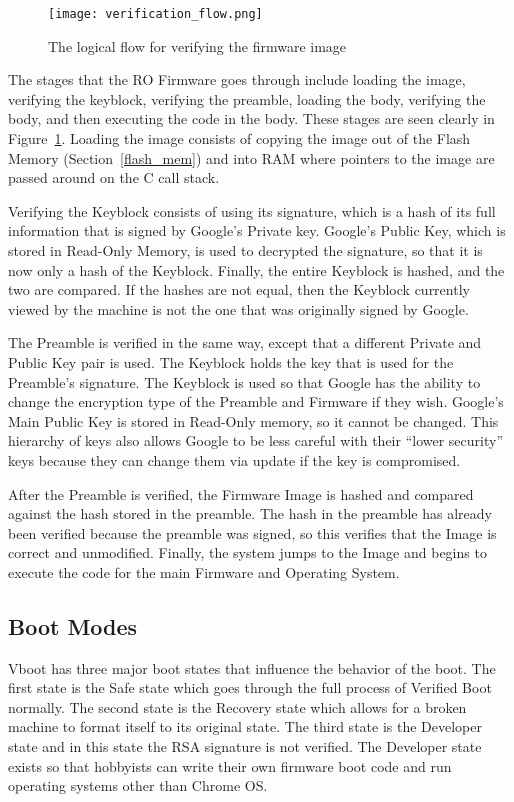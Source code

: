 \documentclass[../report.tex]{subfiles}
\begin{document}
\begin{figure}
  \centering
  \texttt{[image: verification\_flow.png]}
  \caption{The logical flow for verifying the firmware image}\label{fig:verif_flow}
\end{figure}

The stages that the RO Firmware goes through include loading the image, verifying the keyblock, verifying the preamble, loading the body, verifying the body, and then executing the code in the body. 
These stages are seen clearly in Figure~\ref{fig:verif_flow}.
Loading the image consists of copying the image out of the Flash Memory (Section~\ref{flash_mem}) and into RAM where pointers to the image are passed around on the C call stack.

Verifying the Keyblock consists of using its signature, which is a hash of its full information that is signed by Google's Private key.
Google's Public Key, which is stored in Read-Only Memory, is used to decrypted the signature, so that it is now only a hash of the Keyblock.
Finally, the entire Keyblock is hashed, and the two are compared.
If the hashes are not equal, then the Keyblock currently viewed by the machine is not the one that was originally signed by Google.

The Preamble is verified in the same way, except that a different Private and Public Key pair is used.
The Keyblock holds the key that is used for the Preamble's signature.
The Keyblock is used so that Google has the ability to change the encryption
type of the Preamble and Firmware if they wish.
Google's Main Public Key is stored in Read-Only memory, so it cannot be changed.
This hierarchy of keys also allows Google to be less careful with their ``lower
security'' keys because they can change them via update if the key is
compromised.

After the Preamble is verified, the Firmware Image is hashed and compared
against the hash stored in the preamble. 
The hash in the preamble has already been verified because the preamble was
signed, so this verifies that the Image is correct and unmodified. Finally, the
system jumps to the Image and begins to execute the code for the main Firmware
and Operating System.


\subsection{Boot Modes}\label{sec:boot-modes}

Vboot has three major boot states that influence the behavior of the boot. 
The first state is the Safe state which goes through the full process of Verified Boot normally.
The second state is the Recovery state which allows for a broken machine to format itself to its original state.
The third state is the Developer state and in this state the RSA signature is not verified.
The Developer state exists so that hobbyists can write their own firmware boot code and run operating systems other than Chrome OS\@.
\end{document}
